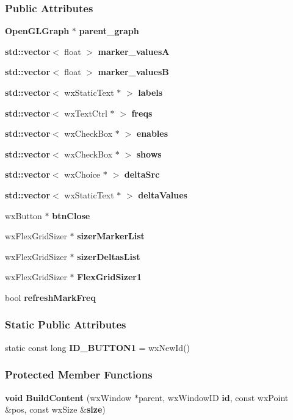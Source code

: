 \subsubsection*{Public Attributes}
\begin{DoxyCompactItemize}
\item 
{\bf Open\+G\+L\+Graph} $\ast$ {\bf parent\+\_\+graph}
\item 
{\bf std\+::vector}$<$ float $>$ {\bf marker\+\_\+valuesA}
\item 
{\bf std\+::vector}$<$ float $>$ {\bf marker\+\_\+valuesB}
\item 
{\bf std\+::vector}$<$ wx\+Static\+Text $\ast$ $>$ {\bf labels}
\item 
{\bf std\+::vector}$<$ wx\+Text\+Ctrl $\ast$ $>$ {\bf freqs}
\item 
{\bf std\+::vector}$<$ wx\+Check\+Box $\ast$ $>$ {\bf enables}
\item 
{\bf std\+::vector}$<$ wx\+Check\+Box $\ast$ $>$ {\bf shows}
\item 
{\bf std\+::vector}$<$ wx\+Choice $\ast$ $>$ {\bf delta\+Src}
\item 
{\bf std\+::vector}$<$ wx\+Static\+Text $\ast$ $>$ {\bf delta\+Values}
\item 
wx\+Button $\ast$ {\bf btn\+Close}
\item 
wx\+Flex\+Grid\+Sizer $\ast$ {\bf sizer\+Marker\+List}
\item 
wx\+Flex\+Grid\+Sizer $\ast$ {\bf sizer\+Deltas\+List}
\item 
wx\+Flex\+Grid\+Sizer $\ast$ {\bf Flex\+Grid\+Sizer1}
\item 
bool {\bf refresh\+Mark\+Freq}
\end{DoxyCompactItemize}
\subsubsection*{Static Public Attributes}
\begin{DoxyCompactItemize}
\item 
static const long {\bf I\+D\+\_\+\+B\+U\+T\+T\+O\+N1} = wx\+New\+Id()
\end{DoxyCompactItemize}
\subsubsection*{Protected Member Functions}
\begin{DoxyCompactItemize}
\item 
{\bf void} {\bf Build\+Content} (wx\+Window $\ast$parent, wx\+Window\+ID {\bf id}, const wx\+Point \&pos, const wx\+Size \&{\bf size})
\end{DoxyCompactItemize}
